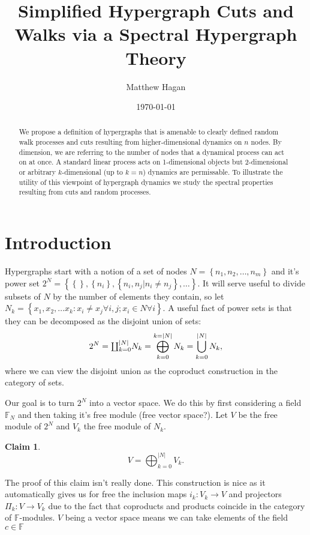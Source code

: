 \documentclass{article}
\title{Simplified Hypergraph Cuts and Walks via a Spectral Hypergraph Theory}
\author{Matthew Hagan}
\date{\today}
\newcommand{\set}[1]{\left\{ #1 \right\}}
\newcommand{\field}{\mathbb{F}}
\newtheorem{claim}[theorem]{Claim}
\newcommand\disjointUnion{\rotatebox[origin=c]{180}{$\prod$}}
\begin{document}
\maketitle
\begin{abstract}
	We propose a definition of hypergraphs that is amenable to clearly defined random walk processes and cuts resulting from higher-dimensional dynamics on $n$ nodes. By dimension, we are referring to the number of nodes that a dynamical process can act on at once. A standard linear process acts on 1-dimensional objects but 2-dimensional or arbitrary $k$-dimensional (up to $k=n$) dynamics are permissable. To illustrate the utility of this viewpoint of hypergraph dynamics we study the spectral properties resulting from cuts and random processes.
\end{abstract}
\tableofcontents

\section{Introduction}

Hypergraphs start with a notion of a set of nodes $N = \set{n_1, n_2, \ldots, n_m}$ and it's power set $2^N = \set{ \set{}, \set{n_i}, \set{n_i, n_j | n_i \neq n_j}, \ldots }$. It will serve useful to divide subsets of $N$ by the number of elements they contain, so let $N_k = \set{x_1, x_2, \ldots x_k : x_i \neq x_j \forall i,j ; x_i \in N \forall i}$. A useful fact of power sets is that they can be decomposed as the disjoint union of sets:
\begin{equation}
    2^N = \disjointUnion_{k = 0}^{|N|} N_k = \bigoplus_{k=0}^{k = |N|} N_k = \bigcup_{k=0}^{|N|} N_k,
\end{equation}
where we can view the disjoint union as the coproduct construction in the category of sets.

Our goal is to turn $2^N$ into a vector space. We do this by first considering a field $\field_N$ and then taking it's free module (free vector space?). Let $V$ be the free module of $2^N$ and $V_k$ the free module of $N_k$. 
\begin{claim}
\begin{equation}
        V = \bigoplus_{k=0}^{|N|} V_k.
\end{equation}
\end{claim}
The proof of this claim isn't really done. This construction is nice as it automatically gives us for free the inclusion maps $i_k : V_k \to V$ and projectors $\Pi_k : V \to V_k$ due to the fact that coproducts and products coincide in the category of $\field$-modules. $V$ being a vector space means we can take elements of the field $c \in \field$ 
\end{document}
